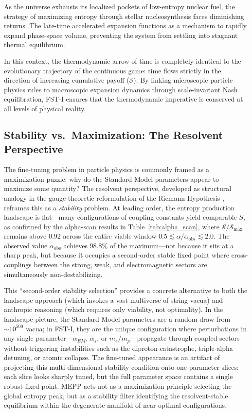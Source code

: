 \documentclass[12pt,a4paper]{article}
\theoremstyle{remark}
\begin{document}
As the universe exhausts its localized pockets of low-entropy nuclear fuel, the strategy of maximizing entropy through stellar nucleosynthesis faces diminishing returns. The late-time accelerated expansion functions as a mechanism to rapidly expand phase-space volume, preventing the system from settling into stagnant thermal equilibrium.

In this context, the thermodynamic arrow of time is completely identical to the evolutionary trajectory of the continuous game: time flows strictly in the direction of increasing cumulative payoff ($\mathcal{S}$). By linking microscopic particle physics rules to macroscopic expansion dynamics through scale-invariant Nash equilibration, FST-I ensures that the thermodynamic imperative is conserved at all levels of physical reality.

\subsection{Stability vs.\ Maximization: The Resolvent Perspective}

The fine-tuning problem in particle physics is commonly framed as a maximization puzzle: why do the Standard Model parameters appear to maximize some quantity? The resolvent perspective, developed as structural analogy in the gauge-theoretic reformulation of the Riemann Hypothesis \citep{GeigerRH2026b}, reframes this as a \emph{stability} problem. At leading order, the entropy production landscape is flat---many configurations of coupling constants yield comparable $\dot{S}$, as confirmed by the alpha-scan results in Table~\ref{tab:alpha_scan}, where $\mathcal{S}/\mathcal{S}_{\text{max}}$ remains above 0.92 across the entire viable window $0.5 \lesssim \alpha/\alpha_{\text{obs}} \lesssim 2.0$. The observed value $\alpha_{\text{obs}}$ achieves 98.8\% of the maximum---not because it sits at a sharp peak, but because it occupies a second-order stable fixed point where cross-couplings between the strong, weak, and electromagnetic sectors are simultaneously non-destabilizing.

This ``second-order stability selection'' provides a concrete alternative to both the landscape approach (which invokes a vast multiverse of string vacua) and anthropic reasoning (which requires only viability, not optimality). In the landscape picture, the Standard Model parameters are a random draw from $\sim 10^{500}$ vacua; in FST-I, they are the unique configuration where perturbations in any single parameter---$\alpha_{EM}$, $\alpha_s$, or $m_e/m_p$---propagate through coupled sectors without triggering instabilities such as the diproton catastrophe, triple-alpha detuning, or atomic collapse. The fine-tuned appearance is an artifact of projecting this multi-dimensional stability condition onto one-parameter slices: each slice looks sharply tuned, but the full parameter space contains a single robust fixed point. MEPP acts not as a maximization principle selecting the global entropy peak, but as a stability filter identifying the resolvent-stable equilibrium within the degenerate manifold of near-optimal configurations.
\end{document}
